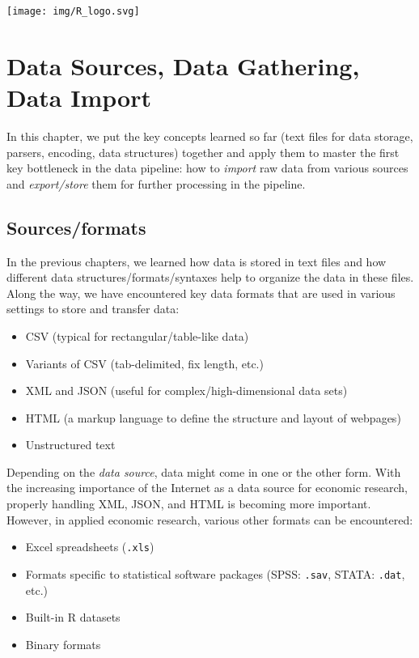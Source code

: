 \documentclass[
  12pt,
]{style/krantz}
\providecommand{\tightlist}{%
  \setlength{\itemsep}{0pt}\setlength{\parskip}{0pt}}
\begin{document}
\begin{center}\texttt{[image: img/R\_logo.svg]} \end{center}

\hypertarget{data-sources-data-gathering-data-import}{%
\chapter{Data Sources, Data Gathering, Data Import}\label{data-sources-data-gathering-data-import}}

In this chapter, we put the key concepts learned so far (text files for data storage, parsers, encoding, data structures) together and apply them to master the first key bottleneck in the data pipeline: how to \emph{import} raw data from various sources and \emph{export/store} them for further processing in the pipeline.

\hypertarget{sourcesformats}{%
\section{Sources/formats}\label{sourcesformats}}

In the previous chapters, we learned how data is stored in text files and how different data structures/formats/syntaxes help to organize the data in these files. Along the way, we have encountered key data formats that are used in various settings to store and transfer data:

\begin{itemize}
\tightlist
\item
  CSV (typical for rectangular/table-like data)
\item
  Variants of CSV (tab-delimited, fix length, etc.)
\item
  XML and JSON (useful for complex/high-dimensional data sets)
\item
  HTML (a markup language to define the structure and layout of webpages)
\item
  Unstructured text
\end{itemize}

Depending on the \emph{data source}, data might come in one or the other form. With the increasing importance of the Internet as a data source for economic research, properly handling XML, JSON, and HTML is becoming more important. However, in applied economic research, various other formats can be encountered:

\begin{itemize}
\tightlist
\item
  Excel spreadsheets (\texttt{.xls})
\item
  Formats specific to statistical software packages (SPSS: \texttt{.sav}, STATA: \texttt{.dat}, etc.)
\item
  Built-in R datasets
\item
  Binary formats
\end{itemize}
\end{document}
